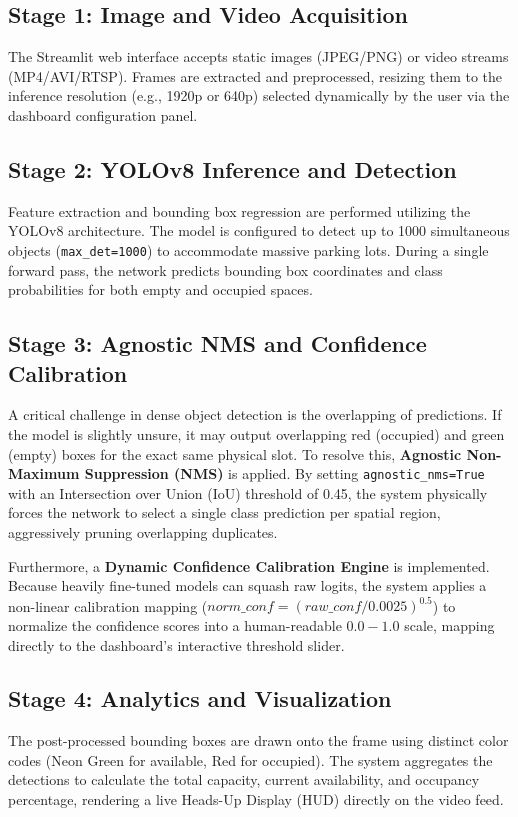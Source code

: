 \documentclass[conference]{IEEEtran}
\begin{document}
\subsection{Stage 1: Image and Video Acquisition}
The Streamlit web interface accepts static images (JPEG/PNG) or video streams (MP4/AVI/RTSP). Frames are extracted and preprocessed, resizing them to the inference resolution (e.g., 1920p or 640p) selected dynamically by the user via the dashboard configuration panel.

\subsection{Stage 2: YOLOv8 Inference and Detection}
Feature extraction and bounding box regression are performed utilizing the YOLOv8 architecture. The model is configured to detect up to 1000 simultaneous objects (\texttt{max\_det=1000}) to accommodate massive parking lots. During a single forward pass, the network predicts bounding box coordinates and class probabilities for both empty and occupied spaces.

\subsection{Stage 3: Agnostic NMS and Confidence Calibration}
A critical challenge in dense object detection is the overlapping of predictions. If the model is slightly unsure, it may output overlapping red (occupied) and green (empty) boxes for the exact same physical slot. To resolve this, \textbf{Agnostic Non-Maximum Suppression (NMS)} is applied. By setting \texttt{agnostic\_nms=True} with an Intersection over Union (IoU) threshold of 0.45, the system physically forces the network to select a single class prediction per spatial region, aggressively pruning overlapping duplicates.

Furthermore, a \textbf{Dynamic Confidence Calibration Engine} is implemented. Because heavily fine-tuned models can squash raw logits, the system applies a non-linear calibration mapping ($norm\_conf = (raw\_conf / 0.0025)^{0.5}$) to normalize the confidence scores into a human-readable $0.0 - 1.0$ scale, mapping directly to the dashboard's interactive threshold slider.

\subsection{Stage 4: Analytics and Visualization}
The post-processed bounding boxes are drawn onto the frame using distinct color codes (Neon Green for available, Red for occupied). The system aggregates the detections to calculate the total capacity, current availability, and occupancy percentage, rendering a live Heads-Up Display (HUD) directly on the video feed.
\end{document}
